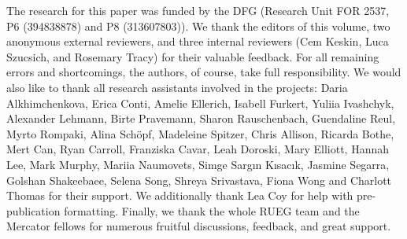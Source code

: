 \documentclass[output=paper,colorlinks,citecolor=brown]{langscibook}
\begin{document}
The research for this paper was funded by the DFG (Research Unit FOR 2537, P6 (394838878) and P8 (313607803)). We thank the editors of this volume, two anonymous external reviewers, and three internal reviewers (Cem Keskin, Luca Szucsich, and Rosemary Tracy) for their valuable feedback. For all remaining errors and shortcomings, the authors, of course, take full responsibility. We would also like to thank all research assistants involved in the projects: Daria Alkhimchenkova, Erica Conti, Amelie Ellerich, Isabell Furkert, Yuliia Ivashchyk, Alexander Lehmann, Birte Pravemann, Sharon Rauschenbach, Guendaline Reul, Myrto Rompaki, Alina Schöpf, Madeleine Spitzer, Chris Allison, Ricarda Bothe, Mert Can, Ryan Carroll, Franziska Cavar, Leah Doroski, Mary Elliott, Hannah Lee, Mark Murphy, Mariia Naumovets, Simge Sargın Kısacık, Jasmine Segarra, Golshan Shakeebaee, Selena Song, Shreya Srivastava, Fiona Wong and Charlott Thomas for their support. We additionally thank Lea Coy for help with pre-publication formatting. Finally, we thank the whole RUEG team and the Mercator fellows for numerous fruitful discussions, feedback, and great support.

{\sloppy\printbibliography[heading=subbibliography,notkeyword=this]}
\cleardoublepage
\end{document}
